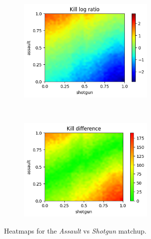 \begin{figure}[H]
    \centering
    \begin{subfigure}[t]{0.5\textwidth}
        \centering
        \includegraphics[height=5cm]{Images/images/heatmaps/short-range/assault_shotgun_heatmap_ratio.png}
    \end{subfigure}%
    ~ 
    \begin{subfigure}[t]{0.5\textwidth}
        \centering
        \includegraphics[height=5cm]{Images/images/heatmaps/short-range/assault_shotgun_heatmap_diff.png}
    \end{subfigure}
    \caption{Heatmaps for the \textit{Assault} vs \textit{Shotgun} matchup.}
    \label{fig:balance_assault_shotgun_short}
\end{figure}

